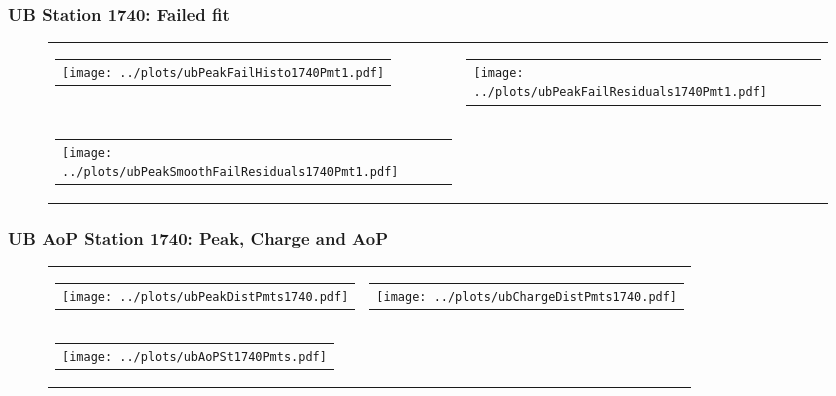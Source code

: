 \documentclass[aspectratio=169]{beamer}
\begin{document}
\begin{frame}
  \frametitle{UB Station 1740: Failed fit}
  \begin{figure}
    \centering
    \begin{tabularx}{\textwidth}{CC}
      \begin{tabular}{l}
        \texttt{[image: ../plots/ubPeakFailHisto1740Pmt1.pdf]}
      \end{tabular}
      &
      \begin{tabular}{l}
        \texttt{[image: ../plots/ubPeakFailResiduals1740Pmt1.pdf]}
      \end{tabular}
      \\
      \begin{tabular}{l}
        \texttt{[image: ../plots/ubPeakSmoothFailResiduals1740Pmt1.pdf]}
      \end{tabular}
    \end{tabularx}
  \end{figure}

\end{frame}



\begin{frame}
  \frametitle{UB AoP Station 1740: Peak, Charge and AoP}
  \begin{figure}
    \centering
    \begin{tabularx}{\textwidth}{CC}
      \begin{tabular}{l}
        \texttt{[image: ../plots/ubPeakDistPmts1740.pdf]}
      \end{tabular}
      &
      \begin{tabular}{l}
        \texttt{[image: ../plots/ubChargeDistPmts1740.pdf]}
      \end{tabular}
      \\
      \begin{tabular}{l}
        \texttt{[image: ../plots/ubAoPSt1740Pmts.pdf]}
      \end{tabular}
    \end{tabularx}
  \end{figure}
\end{frame}


\end{document}
